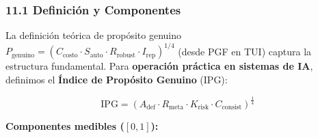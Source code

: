\subsubsection{11.1 Definición y
Componentes}\label{definiciuxf3n-y-componentes}

La definición teórica de propósito genuino
\(P_{\text{genuino}} = \left(C_{\text{costo}} \cdot S_{\text{auto}} \cdot R_{\text{robust}} \cdot I_{\text{rep}}\right)^{1/4}\)
(desde PGF en TUI) captura la estructura fundamental. Para
\textbf{operación práctica en sistemas de IA}, definimos el
\textbf{Índice de Propósito Genuino} (IPG):

\[
\boxed{\mathrm{IPG}=\left(A_{\text{def}} \cdot R_{\text{meta}} \cdot K_{\text{risk}} \cdot C_{\text{consist}}\right)^{\tfrac{1}{4}}}
\]

\textbf{Componentes medibles (\([0,1]\)):}

